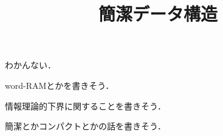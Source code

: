 \documentclass{jsarticle}
\title{簡潔データ構造}
\begin{document}
\maketitle

わかんない．

word-RAMとかを書きそう．

情報理論的下界に関することを書きそう．

簡潔とかコンパクトとかの話を書きそう．
\end{document}
